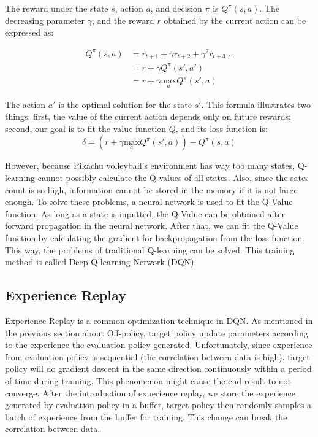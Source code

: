 \documentclass[sigconf]{acmart}
\begin{document}
The reward under the state $s$, action $a$, and decision $\pi$ is $Q^\pi(s,a)$. The decreasing parameter $\gamma$, and the reward $r$ obtained by the current action can be expressed as:

$$
\begin{aligned}
  Q^{\pi}(s, a) &= r_{t+1} + \gamma r_{t+2} + \gamma^2 r_{t+3} ... \\
  &= r + \gamma Q^{\pi}(s', a') \\
  &= r + \gamma \underset{a}{\text{max}} Q^{\pi}(s', a)
  \end{aligned}
$$

The action $a'$ is the optimal solution for the state $s'$. This formula illustrates two things: first, the value of the current action depends only on future rewards; second, our goal is to fit the value function $Q$, and its loss function is:
$$
\delta = (r + \gamma \underset{a}{\text{max}} Q^{\pi}(s', a)) - Q^{\pi}(s, a)
$$

However, because Pikachu volleyball's environment has way too many states, Q-learning cannot possibly calculate the Q values of all states. Also, since the sates count is so high, information cannot be stored in the memory if it is not large enough. To solve these problems, a neural network is used to fit the Q-Value function. As long as a state is inputted, the Q-Value can be obtained after forward propagation in the neural network. After that, we can fit the Q-Value function by calculating the gradient for backpropagation from the loss function. This way, the problems of traditional Q-learning can be solved. This training method is called Deep Q-learning Network (DQN).


\subsection{Experience Replay}
Experience Replay is a common optimization technique in DQN. As mentioned in the previous section about Off-policy, target policy update parameters according to the experience the evaluation policy generated. Unfortunately, since experience from evaluation policy is sequential (the correlation between data is high), target policy will do gradient descent in the same direction continuously within a period of time during training. This phenomenon might cause the end result to not converge. After the introduction of experience replay, we store the experience generated by evaluation policy in a buffer, target policy then randomly samples a batch of experience from the buffer for training. This change can break the correlation between data.
\end{document}
